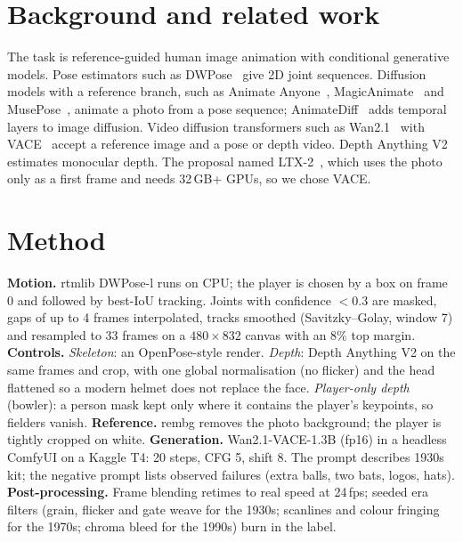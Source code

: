 \documentclass[11pt,a4paper,twocolumn]{article}
\begin{document}
\section{Background and related work}
The task is reference-guided human image animation with conditional generative models. Pose estimators such as
DWPose~\cite{yang2023dwpose} give 2D joint sequences. Diffusion models with a reference branch, such as Animate
Anyone~\cite{hu2023animateanyone}, MagicAnimate~\cite{xu2023magicanimate} and MusePose~\cite{musepose2024}, animate a
photo from a pose sequence; AnimateDiff~\cite{guo2023animatediff} adds temporal layers to image diffusion. Video
diffusion transformers such as Wan2.1~\cite{wan2025} with VACE~\cite{jiang2025vace} accept a reference image and a pose
or depth video. Depth Anything V2~\cite{yang2024depthanythingv2} estimates monocular depth. The proposal named
LTX-2~\cite{ltx2}, which uses the photo only as a first frame and needs 32\,GB+ GPUs, so we chose VACE.

\section{Method}
\textbf{Motion.} rtmlib DWPose-l runs on CPU; the player is chosen by a box on frame 0 and followed by best-IoU
tracking. Joints with confidence $<0.3$ are masked, gaps of up to 4 frames interpolated, tracks smoothed
(Savitzky--Golay, window 7) and resampled to 33 frames on a $480{\times}832$ canvas with an 8\% top margin.
\textbf{Controls.} \emph{Skeleton}: an OpenPose-style render. \emph{Depth}: Depth Anything V2 on the same frames and
crop, with one global normalisation (no flicker) and the head flattened so a modern helmet does not replace the face.
\emph{Player-only depth} (bowler): a person mask kept only where it contains the player's keypoints, so fielders vanish.
\textbf{Reference.} rembg removes the photo background; the player is tightly cropped on white.
\textbf{Generation.} Wan2.1-VACE-1.3B (fp16) in a headless ComfyUI on a Kaggle T4: 20 steps, CFG 5, shift 8. The prompt
describes 1930s kit; the negative prompt lists observed failures (extra balls, two bats, logos, hats).
\textbf{Post-processing.} Frame blending retimes to real speed at 24\,fps; seeded era filters (grain, flicker and gate
weave for the 1930s; scanlines and colour fringing for the 1970s; chroma bleed for the 1990s) burn in the label.
\end{document}
